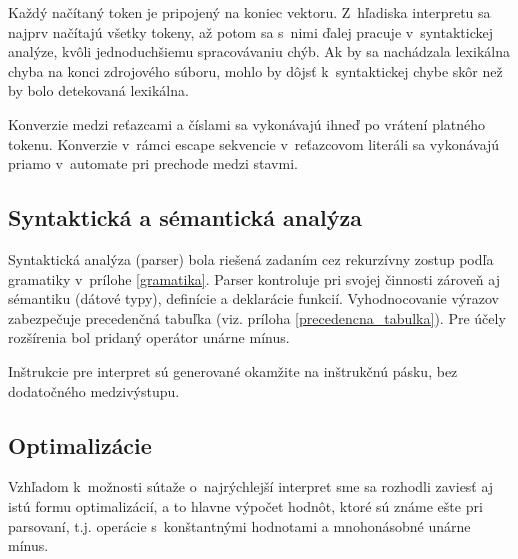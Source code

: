 \documentclass[12pt,a4paper,titlepage,final]{article}
\begin{document}
Každý načítaný token je pripojený na koniec vektoru. Z~hľadiska interpretu sa
najprv načítajú všetky tokeny, až potom sa s~nimi ďalej pracuje v~syntaktickej
analýze, kvôli jednoduchšiemu spracovávaniu chýb. Ak by sa nachádzala
 lexikálna chyba na konci zdrojového súboru, mohlo by dôjsť k~syntaktickej chybe
 skôr než by bolo detekovaná lexikálna.

Konverzie medzi reťazcami a číslami sa vykonávajú ihneď po vrátení platného tokenu.
Konverzie v~rámci escape sekvencie v~reťazcovom literáli sa vykonávajú
 priamo v~automate pri prechode medzi stavmi.

\subsection{Syntaktická a sémantická analýza}
Syntaktická analýza (parser) bola riešená zadaním cez rekurzívny zostup 
 podľa gramatiky v~prílohe \ref{gramatika}.
Parser kontroluje pri svojej činnosti zároveň aj sémantiku (dátové typy),
definície a deklarácie funkcií.
Vyhodnocovanie výrazov zabezpečuje precedenčná tabuľka 
 (viz. príloha \ref{precedencna_tabulka}). Pre účely rozšírenia bol
 pridaný operátor unárne mínus.

Inštrukcie pre interpret sú generované okamžite na inštrukčnú pásku,
 bez dodatočného medzivýstupu.

     
     
     
     

\subsection{Optimalizácie}
Vzhľadom k~možnosti sútaže o~najrýchlejší interpret sme sa rozhodli zaviesť aj
istú formu optimalizácií, a to hlavne výpočet hodnôt, ktoré sú známe ešte pri
parsovaní, t.j. operácie s~konštantnými hodnotami a mnohonásobné unárne mínus.
\end{document}
